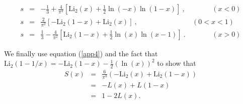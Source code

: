 \documentclass[a4paper,11pt]{article}
\begin{document}
\begin{eqnarray*}
s &=&-\frac{1}{3}+\frac{4}{\pi ^{2}}\left[ \mathrm{Li}_2\left( x\right)
+\frac{1}{2}\ln \left( -x\right) \ln \left( 1-x\right) \right]\ ,\ \ \ \ \ \
\ \ \ \ \ \ \ \ \ \ \ \left( x<0\right) \\
s &=&\frac{2}{\pi ^{2}}\left[ -\mathrm{Li}_2\left( 1-x\right) +\mathrm{ 
Li}_2\left( x\right) \right]\ ,\ \ \ \ \ \ \ \ \ \ \ \ \ \ \ \ \ \
\ \ \ \ \ \ \ \ \ \ \ \ \ \ \ \ \ \left( 0<x<1\right) \\
s &=&\frac{1}{3}-\frac{4}{\pi ^{2}}\left[ \mathrm{Li}_2\left( 1-x\right) + 
\frac{1}{2}\ln \left( x\right) \ln \left( x-1\right) \right]\ .\ \ \ \ \ \ \
\ \ \ \ \ \ \ \ \ \ \left( x>0\right)
\end{eqnarray*}

\noindent
We finally use equation (\ref{app4}) and the fact that $\mathrm{Li}_2 
\left( 1-1/x\right) =-\mathrm{Li}_2\left( 1-x\right) -\frac{1}{2}\left( \ln
\left( x\right) \right) ^{2}$ to show that 
\begin{eqnarray*}
S\left( x\right) &=&\frac{6}{\pi ^{3}}\left( -\mathrm{Li}_2\left(
x\right) +\mathrm{Li}_2\left( 1-x\right) \right) \\
&=&-L\left( x\right) +L\left( 1-x\right) \\
&=&1-2L\left( x\right) .
\end{eqnarray*}

{\small {\ }}

\eject
\end{document}
